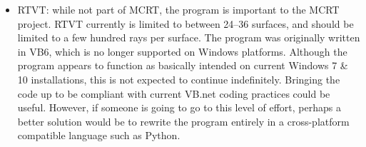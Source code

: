 \documentclass{article}
\begin{document}
\begin{itemize}
    \item RTVT: while not part of MCRT, the program is important to the MCRT project. RTVT currently is limited to between 24--36 surfaces, and should be limited to a few hundred rays per surface. The program was originally written in VB6, which is no longer supported on Windows platforms. Although the program appears to function as basically intended on current Windows 7 \& 10 installations, this is not expected to continue indefinitely. Bringing the code up to be compliant with current VB.net coding practices could be useful. However, if someone is going to go to this level of effort, perhaps a better solution would be to rewrite the program entirely in a cross-platform compatible language such as Python.

\end{itemize}

\newpage
\renewcommand\bibname{References}

\end{document}
